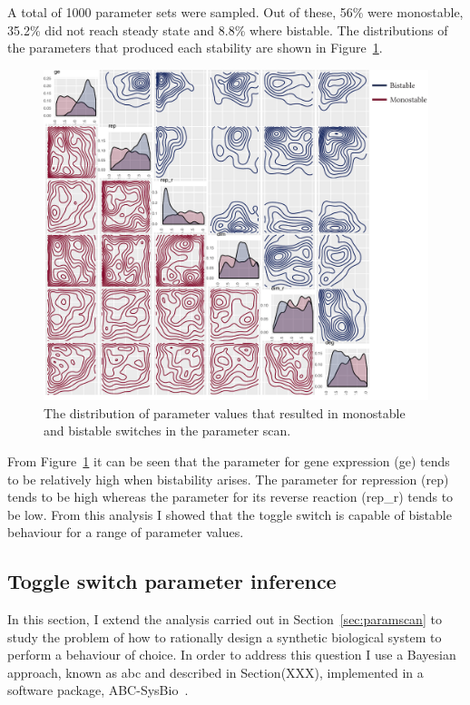 A total of 1000 parameter sets were sampled. Out of these, 56\% were monostable, 35.2\% did not reach steady state and 8.8\% where bistable. The distributions of the parameters that produced each stability are shown in Figure~\ref{fig:scan ode param hist}. 

\begin{figure}
\centering
\begin{minipage}[c]{1\textwidth}
\centering
    \includegraphics[width=1.2\textwidth]{../../chapters/chapterABCSysBio/images/param_scan_combo.pdf}
    \caption[Distributions of the parameters resulting in each stability obtained by the parameter scan]{The distribution of parameter values that resulted in monostable and bistable switches in the parameter scan. }
    \label{fig:scan ode param hist}
\end{minipage}
\end{figure}


From Figure~\ref{fig:scan ode param hist} it can be seen that the parameter for gene expression (ge) tends to be relatively high when bistability arises. The parameter for repression (rep) tends to be high whereas the parameter for its reverse reaction (rep\_r) tends to be low. From this analysis I showed that the toggle switch is capable of bistable behaviour for a range of parameter values. 

\subsection{Toggle switch parameter inference}
\label{sec:param_inf}
In this section, I extend the analysis carried out in Section~\ref{sec:paramscan} to study the problem of how to rationally design a synthetic biological system to perform a behaviour of choice.  In order to address this question I use a Bayesian approach, known as \acrlong{abc} and described in Section(XXX), implemented in a software package, ABC-SysBio~\autocite{Liepe:2010eg}. 

